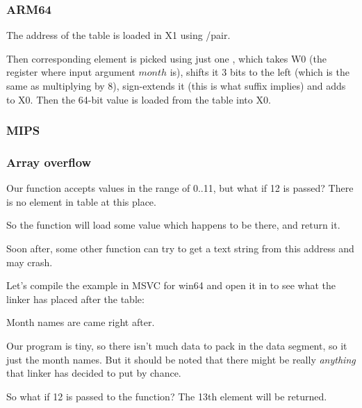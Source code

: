 \subsubsection{ARM64}




The address of the table is loaded in X1 using \ADRP/\ADD pair.

Then corresponding element is picked using just one \LDR, which takes W0 
(the register where input argument $month$ is), shifts it 3 bits to the left (which is the same as multiplying by 8), 
sign-extends it (this is what  suffix implies) and adds to X0.
Then the 64-bit value is loaded from the table into X0.

\subsubsection{MIPS}



\subsubsection{Array overflow}

Our function accepts values in the range of 0..11, but what if 12 is passed?
There is no element in table at this place.

So the function will load some value which happens to be there, and return it.

Soon after, some other function can try to get a text string from this address and may crash.

Let's compile the example in MSVC for win64 and open it in \IDA to see what the linker has placed after the table:



Month names are came right after.

Our program is tiny, so there isn't much data to pack in the data segment, 
so it just the month names.
But it should be noted that there might be really \emph{anything} that linker has decided to put by chance.

So what if 12 is passed to the function?
The 13th element will be returned.

